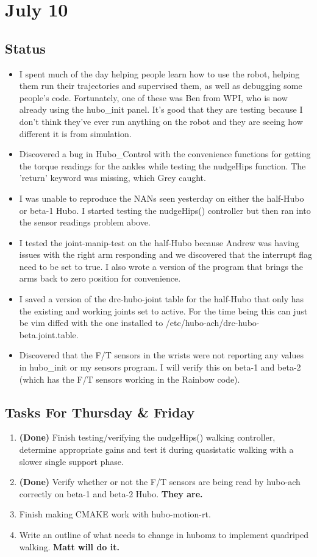 \documentclass[letterpaper, 10 pt]{report}
\begin{document}
\section*{July 10}
\subsection*{Status}
\begin{itemize}
\item I spent much of the day helping people learn how to use the robot, helping them run their trajectories and supervised them, as well as debugging some people's code. Fortunately, one of these was Ben from WPI, who is now already using the hubo\_init panel. It's good that they are testing because I don't think they've ever run anything on the robot and they are seeing how different it is from simulation.
\item Discovered a bug in Hubo\_Control with the convenience functions for getting the torque readings for the ankles while testing the nudgeHips function. The 'return' keyword was missing, which Grey caught.
\item I was unable to reproduce the NANs seen yesterday on either the half-Hubo or beta-1 Hubo. I started testing the nudgeHips() controller but then ran into the sensor readings problem above.
\item I tested the joint-manip-test on the half-Hubo because Andrew was having issues with the right arm responding and we discovered that the interrupt flag need to be set to true. I also wrote a version of the program that brings the arms back to zero position for convenience.
\item I saved a version of the drc-hubo-joint table for the half-Hubo that only has the existing and working joints set to active. For the time being this can just be vim diffed with the one installed to /etc/hubo-ach/drc-hubo-beta.joint.table.
\item Discovered that the F/T sensors in the wrists were not reporting any values in hubo\_init or my sensors program. I will verify this on beta-1 and beta-2 (which has the F/T sensors working in the Rainbow code).
\end{itemize}
\subsection*{Tasks For Thursday \& Friday}
\begin{enumerate}
\item \textbf{(Done)} Finish testing/verifying the nudgeHips() walking controller, determine appropriate gains and test it during quasistatic walking with a slower single support phase.
\item \textbf{(Done)} Verify whether or not the F/T sensors are being read by hubo-ach correctly on beta-1 and beta-2 Hubo. \textbf{They are.}
\item Finish making CMAKE work with hubo-motion-rt.
\item Write an outline of what needs to change in hubomz to implement quadriped walking. \textbf{Matt will do it.}
\end{enumerate}
\end{document}
